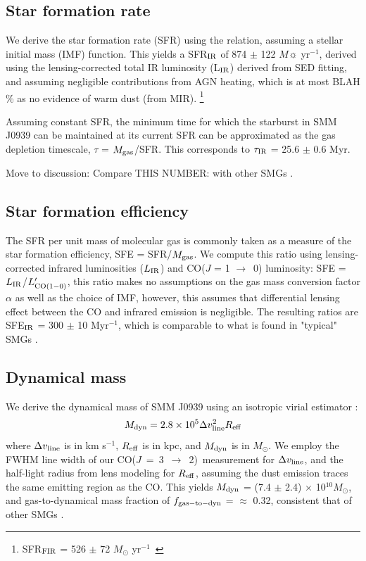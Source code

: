\documentclass[twocolumn,apj,numberedappendix]{emulateapj}
\newcommand{\Msun}{\mbox{$M_{\odot}$}}
\newcommand{\rarr}{$\rightarrow$}
\newcommand{\CO}{\mbox{CO($J$ = 3 $\rightarrow$ 2) }}
\newcommand{\Lp}{\mbox{$L^{\prime}_{\rm CO(1-0)}$}}
\newcommand{\eg}{{\sl e.g.,~}}
\newcommand{\pmOne}{$^{-1}$}
\begin{document}
\subsection{Star formation rate}
We derive the star formation rate (SFR) using the \citet{Kennicutt98a} relation, assuming a \citet{Chabrier03a}
stellar initial mass (IMF) function. This yields a SFR$_{\rm IR}$ of 874 $\pm$ 122 $M\sun$ yr\pmOne, derived using the lensing-corrected total IR luminosity (L$_{\rm IR}$) derived from SED 
fitting, and assuming negligible contributions from AGN heating, which is at most BLAH \% as no evidence of warm dust (from MIR). \footnote{SFR$_{\rm FIR}$ = 526 $\pm$ 72 $M_
\odot$ yr\pmOne\ }

Assuming constant SFR, the minimum time for which the starburst in SMM J0939 can be maintained at its
current SFR can be approximated as the gas depletion timescale, $\tau$ = $M_{\rm gas}$/SFR. 
This corresponds to $\tau_{\rm IR}$ = 25.6 $\pm$ 0.6 Myr.

Move to discussion: Compare THIS NUMBER: with other SMGs \citep[\eg][]{Greve05a}. 

\subsection{Star formation efficiency}
The SFR per unit mass of molecular gas is commonly taken as a
measure of the star formation efficiency, SFE = SFR/$M_{\rm gas}$. We compute this ratio using lensing-corrected infrared 
luminosities ($L_{\rm IR}$) and CO($J$ = 1 \rarr\ 0) luminosity: SFE = $L_{\rm IR}$/\Lp, this ratio makes no assumptions on the gas mass conversion factor $\alpha$ as well as the 
choice of IMF, however, this assumes that differential lensing effect between the CO and infrared emission is negligible. 
The resulting ratios are SFE$_{\rm IR}$ = 300 $\pm$ 10 Myr\pmOne, which is comparable
to what is found in "typical" SMGs \citep{Riechers10, Tacconi06, Greve05a}.

\subsection{Dynamical mass} 
We derive the dynamical mass of SMM J0939 using an isotropic virial estimator \citep[\eg][]{Engel10a}:
\begin{equation}
M_{\rm dyn} = 2.8\times 10^5\Delta v_{\rm line}^ 2 R_{\rm eff}
\end{equation}
where $\Delta v_{\rm line}$ is in km s\pmOne, $R_{\rm eff}$ is in kpc, and $M_{\rm dyn}$ is in \Msun.
We employ the FWHM line width of our \CO measurement for $\Delta v_{\rm line}$,
and the half-light radius from lens modeling for $R_{\rm eff}$, assuming the dust emission traces the same emitting region as the CO. This yields $M_{\rm dyn}$ = (7.4 $\pm$ 2.4) $\times$ 10$^{10}$\Msun , and gas-to-dynamical mass fraction of $f_{\rm gas-to-dyn}$ = $\approx$ 0.32, consistent that of other SMGs \citep{Greve06a,Tacconi06a}.
\end{document}
